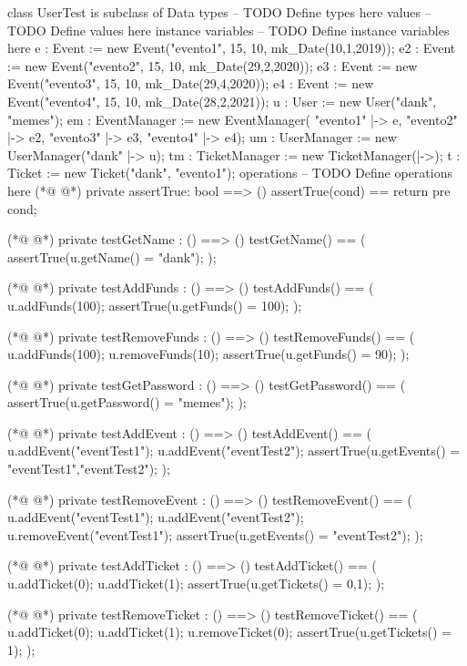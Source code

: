 \begin{vdmpp}[breaklines=true]
class UserTest is subclass of Data
types
-- TODO Define types here
values
-- TODO Define values here
instance variables
-- TODO Define instance variables here
 e : Event := new Event("evento1", 15, 10, mk_Date(10,1,2019));
 e2 : Event := new Event("evento2", 15, 10, mk_Date(29,2,2020));
 e3 : Event := new Event("evento3", 15, 10, mk_Date(29,4,2020));
 e4 : Event := new Event("evento4", 15, 10, mk_Date(28,2,2021));
 u : User := new User("dank", "memes");
 em : EventManager := new EventManager({ "evento1" |-> e, "evento2" |-> e2, "evento3" |-> e3, "evento4" |-> e4});
 um : UserManager := new UserManager({"dank" |-> u});
 tm : TicketManager := new TicketManager({|->});
 t : Ticket := new Ticket("dank", "evento1");
operations
-- TODO Define operations here
(*@
\label{assertTrue:19}
@*)
 private assertTrue: bool ==> ()
  assertTrue(cond) == return
  pre cond;
  
(*@
\label{testGetName:23}
@*)
 private testGetName : () ==> ()
 testGetName() == (
  assertTrue(u.getName() = "dank");
 );
 
(*@
\label{testAddFunds:28}
@*)
 private testAddFunds : () ==> ()
 testAddFunds() == (
  u.addFunds(100);
  assertTrue(u.getFunds() = 100);
 );
 
(*@
\label{testRemoveFunds:34}
@*)
 private testRemoveFunds : () ==> ()
 testRemoveFunds() == (
  u.addFunds(100);
  u.removeFunds(10);
  assertTrue(u.getFunds() = 90);
 );
 
(*@
\label{testGetPassword:41}
@*)
 private testGetPassword : () ==> ()
 testGetPassword() == (
  assertTrue(u.getPassword() = "memes");
 );
 
(*@
\label{testAddEvent:46}
@*)
 private testAddEvent : () ==> ()
 testAddEvent() == (
  u.addEvent("eventTest1");
  u.addEvent("eventTest2");
  assertTrue(u.getEvents() = {"eventTest1","eventTest2"});
 );
 
(*@
\label{testRemoveEvent:53}
@*)
 private testRemoveEvent : () ==> ()
 testRemoveEvent() == (
  u.addEvent("eventTest1");
  u.addEvent("eventTest2");
  u.removeEvent("eventTest1");
  assertTrue(u.getEvents() = {"eventTest2"});
 );
 
(*@
\label{testAddTicket:61}
@*)
 private testAddTicket : () ==> ()
 testAddTicket() == (
  u.addTicket(0);
  u.addTicket(1);
  assertTrue(u.getTickets() = {0,1});
 );
 
(*@
\label{testRemoveTicket:68}
@*)
 private testRemoveTicket : () ==> ()
 testRemoveTicket() == (
  u.addTicket(0);
  u.addTicket(1);
  u.removeTicket(0);
  assertTrue(u.getTickets() = {1});
 );
 

\end{vdmpp}
